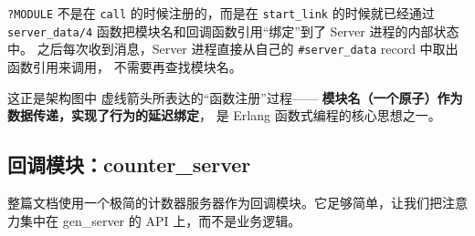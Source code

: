 \documentclass[a4paper,11pt]{article}
\begin{document}
\begin{notebox}[函数式编程的核心思想]
\texttt{?MODULE} 不是在 \texttt{call} 的时候注册的，而是在 \texttt{start\_link} 的时候就已经通过
\texttt{server\_data/4} 函数把模块名和回调函数引用``绑定''到了 Server 进程的内部状态中。
之后每次收到消息，Server 进程直接从自己的 \texttt{\#server\_data} record 中取出函数引用来调用，
不需要再查找模块名。

这正是架构图中  虚线箭头所表达的``函数注册''过程——
\textbf{模块名（一个原子）作为数据传递，实现了行为的延迟绑定}，
是 Erlang 函数式编程的核心思想之一。
\end{notebox}

\subsection{回调模块：counter\_server}

整篇文档使用一个极简的计数器服务器作为回调模块。它足够简单，让我们把注意力集中在 gen\_server 的 API 上，而不是业务逻辑。
\end{document}
